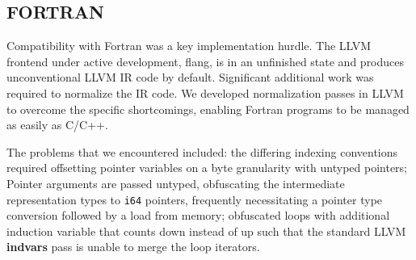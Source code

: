 

\subsection{FORTRAN}
Compatibility with Fortran was a key implementation hurdle. 
The LLVM frontend under active development, flang, is in an unfinished state and
produces unconventional LLVM IR code by default.
Significant additional work was required to normalize the IR code.
We developed normalization passes in LLVM to overcome the specific
shortcomings, enabling Fortran programs to be managed as easily as C/C++.

    The problems that we encountered included: the differing indexing
    conventions required offsetting pointer variables on a byte granularity with
    untyped pointers;
    Pointer arguments are passed untyped, obfuscating the intermediate
    representation types to \texttt{i64} pointers, frequently necessitating a
    pointer type conversion followed by a load from memory;
    obfuscated loops with additional induction variable that counts down instead
    of up such that the standard LLVM \textbf{indvars} pass is unable to merge
    the loop iterators.




